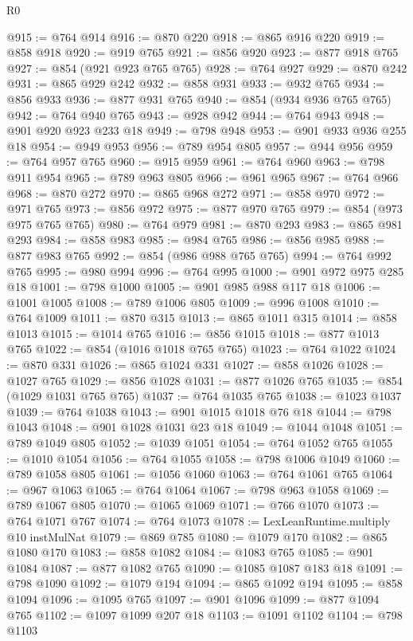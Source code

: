 \begin{lexlean}{R0}
\begin{coremodule}
@915 := @764 @914
@916 := @870 @220
@918 := @865 @916 @220
@919 := @858 @918
@920 := @919 @765
@921 := @856 @920
@923 := @877 @918 @765
@927 := @854 (@921 @923 @765 @765)
@928 := @764 @927
@929 := @870 @242
@931 := @865 @929 @242
@932 := @858 @931
@933 := @932 @765
@934 := @856 @933
@936 := @877 @931 @765
@940 := @854 (@934 @936 @765 @765)
@942 := @764 @940 @765
@943 := @928 @942
@944 := @764 @943
@948 := @901 @920 @923 @233 @18
@949 := @798 @948
@953 := @901 @933 @936 @255 @18
@954 := @949 @953
@956 := @789 @954 @805
@957 := @944 @956
@959 := @764 @957 @765
@960 := @915 @959
@961 := @764 @960
@963 := @798 @911 @954
@965 := @789 @963 @805
@966 := @961 @965
@967 := @764 @966
@968 := @870 @272
@970 := @865 @968 @272
@971 := @858 @970
@972 := @971 @765
@973 := @856 @972
@975 := @877 @970 @765
@979 := @854 (@973 @975 @765 @765)
@980 := @764 @979
@981 := @870 @293
@983 := @865 @981 @293
@984 := @858 @983
@985 := @984 @765
@986 := @856 @985
@988 := @877 @983 @765
@992 := @854 (@986 @988 @765 @765)
@994 := @764 @992 @765
@995 := @980 @994
@996 := @764 @995
@1000 := @901 @972 @975 @285 @18
@1001 := @798 @1000
@1005 := @901 @985 @988 @117 @18
@1006 := @1001 @1005
@1008 := @789 @1006 @805
@1009 := @996 @1008
@1010 := @764 @1009
@1011 := @870 @315
@1013 := @865 @1011 @315
@1014 := @858 @1013
@1015 := @1014 @765
@1016 := @856 @1015
@1018 := @877 @1013 @765
@1022 := @854 (@1016 @1018 @765 @765)
@1023 := @764 @1022
@1024 := @870 @331
@1026 := @865 @1024 @331
@1027 := @858 @1026
@1028 := @1027 @765
@1029 := @856 @1028
@1031 := @877 @1026 @765
@1035 := @854 (@1029 @1031 @765 @765)
@1037 := @764 @1035 @765
@1038 := @1023 @1037
@1039 := @764 @1038
@1043 := @901 @1015 @1018 @76 @18
@1044 := @798 @1043
@1048 := @901 @1028 @1031 @23 @18
@1049 := @1044 @1048
@1051 := @789 @1049 @805
@1052 := @1039 @1051
@1054 := @764 @1052 @765
@1055 := @1010 @1054
@1056 := @764 @1055
@1058 := @798 @1006 @1049
@1060 := @789 @1058 @805
@1061 := @1056 @1060
@1063 := @764 @1061 @765
@1064 := @967 @1063
@1065 := @764 @1064
@1067 := @798 @963 @1058
@1069 := @789 @1067 @805
@1070 := @1065 @1069
@1071 := @766 @1070
@1073 := @764 @1071 @767
@1074 := @764 @1073
@1078 := LexLeanRuntime.multiply @10 instMulNat
@1079 := @869 @785
@1080 := @1079 @170
@1082 := @865 @1080 @170
@1083 := @858 @1082
@1084 := @1083 @765
@1085 := @901 @1084
@1087 := @877 @1082 @765
@1090 := @1085 @1087 @183 @18
@1091 := @798 @1090
@1092 := @1079 @194
@1094 := @865 @1092 @194
@1095 := @858 @1094
@1096 := @1095 @765
@1097 := @901 @1096
@1099 := @877 @1094 @765
@1102 := @1097 @1099 @207 @18
@1103 := @1091 @1102
@1104 := @798 @1103

\end{coremodule}
\end{lexlean}
